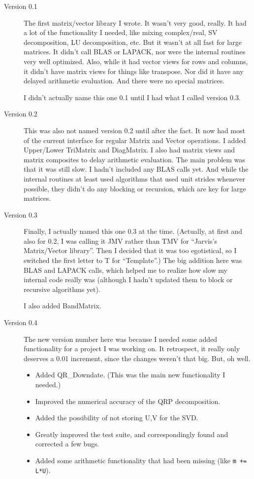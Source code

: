 \documentclass[twoside,letterpaper,11pt]{article}
\renewcommand{\tt}[1]{{\texttt {#1}}}
\begin{document}
\begin{description}
\item[Version 0.1]
The first matrix/vector library I wrote.  It wasn't very good, really. 
It had a lot of the functionality I needed, like mixing complex/real, 
SV decomposition, LU decomposition, etc.  But it wasn't at all fast for 
large matrices.  It didn't call BLAS or LAPACK, nor were the internal routines
very well optimized.  Also, while it had vector views for rows and columns, 
it didn't have matrix views for things like transpose.  Nor did it have any
delayed arithmetic evaluation.  And there were no special matrices.

I didn't actually name this one 0.1 until I had what I called version 0.3.

\item[Version 0.2]
This was also not named version 0.2 until after the fact.  It now had most of 
the current interface for regular Matrix and Vector operations.  I added
Upper/Lower TriMatrix and DiagMatrix.  I also had matrix views and
matrix composites to delay arithmetic evaluation.  The main problem was that
it was still slow.  I hadn't included any BLAS calls yet.  And while the 
internal routines at least used algorithms that used unit strides whenever 
possible, they didn't do any blocking or recursion, which are key for large
matrices.

\item[Version 0.3]
Finally, I actually named this one 0.3 at the time.  (Actually, at first and also 
for 0.2, I was calling it JMV rather than TMV for ``Jarvis's Matrix/Vector library''.
Then I decided that it was too egotistical, so I switched the first letter to 
T for ``Template''.)  The big addition here was BLAS and LAPACK calls, which 
helped me to realize how slow my internal code really was (although I hadn't
updated them to block or recursive algorithms yet).

I also added BandMatrix.

\item[Version 0.4]
The new version number here was because I needed some added functionality for a
project I was working on.  It retrospect, it really only deserves a 0.01 increment,
since the changes weren't that big.  But, oh well.

\begin{itemize}
\item
Added QR\_Downdate.  (This was the main new functionality I needed.)
\item
Improved the numerical accuracy of the QRP decomposition.
\item
Added the possibility of not storing U,V for the SVD.
\item
Greatly improved the test suite, and correspondingly found and corrected a few bugs.
\item
Added some arithmetic functionality that had been missing (like \tt{m += L*U}).
\end{itemize}


\end{description}
\end{document}
